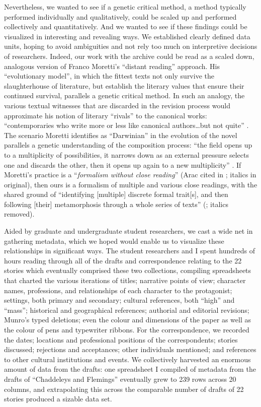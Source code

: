 \begin{paper}
Nevertheless, we wanted to see if a genetic critical method, a method
typically performed individually and qualitatively, could be scaled up
and performed collectively and quantitatively. And we wanted to see if
these findings could be visualized in interesting and revealing ways. We
established clearly defined data units, hoping to avoid ambiguities and
not rely too much on interpretive decisions of researchers. Indeed, our
work with the archive could be read as a scaled down, analogous version
of Franco Moretti's ``distant reading'' approach. His ``evolutionary
model'', in which the fittest texts not only survive the slaughterhouse
of literature, but establish the literary values that ensure their
continued survival, parallels a genetic critical method. In such an
analogy, the various textual witnesses that are discarded in the
revision process would approximate his notion of literary ``rivals'' to
the canonical works: ``contemporaries who write more or less like
canonical authors\ldots but not quite'' \citep[66--67]{moretti_distant_2013}. The scenario
Moretti identifies as ``Darwinian'' in the evolution of the novel
parallels a genetic understanding of the composition process: ``the
field opens up to a multiplicity of possibilities, it narrows down as an
external pressure selects one and discards the other, then it opens up
again to a new multiplicity'' \citep[264]{moretti_signs_1983}. If Moretti's practice
is a ``\emph{formalism without close reading}'' (Arac cited in \cite[65]{moretti_distant_2013}; italics in original), then ours is a formalism of multiple and
various close readings, with the shared ground of ``identifying
{[}multiple{]} discrete formal trait{[}s{]}, and then following
{[}their{]} metamorphosis through a whole series of texts'' (\cite[65]{moretti_distant_2013}; italics
removed).

Aided by graduate and undergraduate student researchers, we cast a wide
net in gathering metadata, which we hoped would enable us to visualize
these relationships in significant ways. The student researchers and I
spent hundreds of hours reading through all of the drafts and
correspondence relating to the 22 stories which eventually comprised
these two collections, compiling spreadsheets that charted the various
iterations of titles; narrative points of view; character names,
professions, and relationships of each character to the protagonist;
settings, both primary and secondary; cultural references, both ``high''
and ``mass''; historical and geographical references; authorial and
editorial revisions; Munro's typed deletions; even the colour and
dimensions of the paper as well as the colour of pens and typewriter
ribbons. For the correspondence, we recorded the dates; locations and
professional positions of the correspondents; stories discussed;
rejections and acceptances; other individuals mentioned; and references
to other cultural institutions and events. We collectively harvested an
enormous amount of data from the drafts: one spreadsheet I compiled of
metadata from the drafts of ``Chaddeleys and Flemings'' eventually grew
to 239 rows across 20 columns, and extrapolating this across the
comparable number of drafts of 22 stories produced a sizable data set.


\end{paper}
